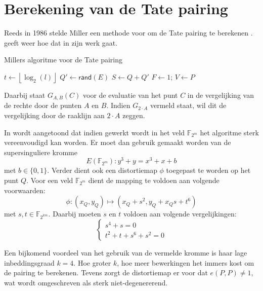 \section{Berekening van de Tate pairing\label{sectie-pairings-berekening}}

Reeds in 1986 stelde Miller een methode voor om de Tate pairing te berekenen \cite{miller, barreto-efficient}.  geeft weer hoe dat in zijn werk gaat.

\begin{algorithm}[h]
	\caption{Millers algoritme voor de Tate pairing}
	\label{algoritme-pairings-miller}
	$t \gets \left\lfloor \log _2 (l) \right\rfloor$\;
	$Q' \gets \textsf{rand}(E)$\;
	$S \gets Q + Q'$\;
	$F \gets 1$; $V \gets P$\;	
\end{algorithm}

Daarbij staat $G_{A, B}(C)$ voor de evaluatie van het punt $C$ in de vergelijking van de rechte door de punten $A$ en $B$. Indien $G_{2 \cdot A}$ vermeld staat, wil dit de vergelijking door de raaklijn aan $2 \cdot A$ zeggen.

In \cite{barreto-efficient} wordt aangetoond dat indien gewerkt wordt in het veld $\mathbb{F}_{2^m}$ het algoritme sterk vereenvoudigd kan worden. Er moet dan gebruik gemaakt worden van de supersinguliere kromme
\[E(\mathbb{F}_{2^m}): y^3 + y = x^3 + x + b\]
met $b \in \{0, 1\}$. Verder dient ook een distortiemap $\phi$ toegepast te worden op het punt $Q$. Voor een veld $\mathbb{F}_{2^m}$ dient de mapping te voldoen aan volgende voorwaarden:
\[\phi : (x_Q, y_Q) \mapsto (x_Q + s^2, y_Q + x_Q s + t^6)\]
met $s, t \in \mathbb{F}_{2^{km}}$. Daarbij moeten $s$ en $t$ voldoen aan volgende vergelijkingen:
\[\left\{\begin{array}{l}
s^4 + s = 0\\
t^2 + t + s^6 + s^2 = 0
\end{array}\right.\]

Een bijkomend voordeel van het gebruik van de vermelde kromme is haar lage inbeddingsgraad $k = 4$. Hoe groter $k$, hoe meer bewerkingen het immers kost om de pairing te berekenen. Tevens zorgt de distortiemap er voor dat $e(P, P) \neq 1$, wat wordt omgeschreven als sterk niet-degenererend.

